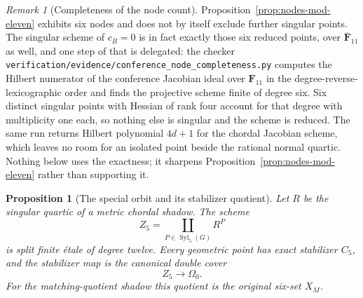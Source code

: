 \documentclass[11pt]{article}
\newtheorem{proposition}[theorem]{Proposition}
\theoremstyle{definition}
\theoremstyle{remark}
\newtheorem{remark}[theorem]{Remark}
\newcommand{\F}{\mathbf F}
\begin{document}
\begin{remark}[Completeness of the node count]
\label{rmk:node-count-complete}
Proposition~\ref{prop:nodes-mod-eleven} exhibits six nodes and does not by
itself exclude further singular points.  The singular scheme of \(c_B=0\) is
in fact exactly those six reduced points, over \(\overline{\F}_{11}\) as well,
and one step of that is delegated: the checker
\texttt{verification/evidence/conference\_node\_completeness.py} computes the
Hilbert numerator of the conference Jacobian ideal over \(\F_{11}\) in the
degree-reverse-lexicographic order and finds the projective scheme finite of
degree six.  Six distinct singular points with Hessian of rank four account
for that degree with multiplicity one each, so nothing else is singular and
the scheme is reduced.  The same run returns Hilbert polynomial \(4d+1\) for
the chordal Jacobian scheme, which leaves no room for an isolated point beside
the rational normal quartic.  Nothing below uses the exactness; it sharpens
Proposition~\ref{prop:nodes-mod-eleven} rather than supporting it.
\end{remark}

\begin{proposition}[The special orbit and its stabilizer quotient]
\label{prop:special-orbit}
Let \(R\) be the singular quartic of a metric chordal shadow.  The scheme
\[
 Z_5=\coprod_{P\in\operatorname{Syl}_5(G)}R^P
\]
is split finite étale of degree twelve.  Every geometric point has exact
stabilizer \(C_5\), and the stabilizer map is the canonical double cover
\[
                 Z_5\longrightarrow\Omega_0.
\]
For the matching-quotient shadow this quotient is the original six-set \(X_M\).
\end{proposition}
\end{document}
